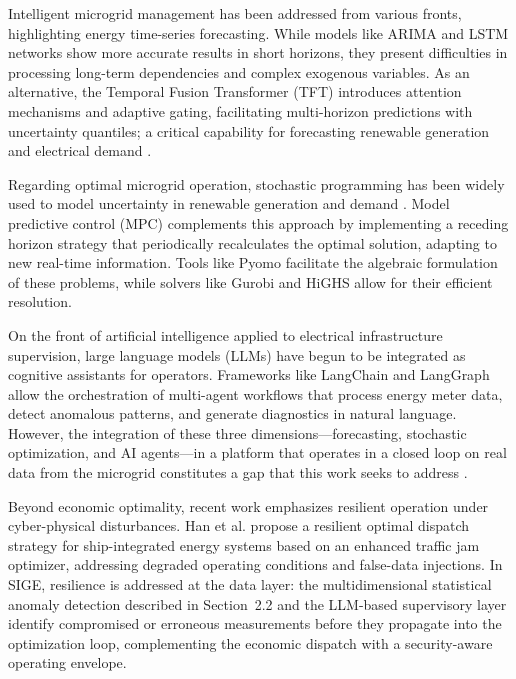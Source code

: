 \documentclass[journal,article,submit,pdftex,moreauthors]{Definitions/mdpi}
\begin{document}
Intelligent microgrid management has been addressed from various fronts, highlighting energy time-series forecasting. While models like ARIMA and LSTM networks show more accurate results in short horizons, they present difficulties in processing long-term dependencies and complex exogenous variables. As an alternative, the Temporal Fusion Transformer (TFT) \cite{ref-lim} introduces attention mechanisms and adaptive gating, facilitating multi-horizon predictions with uncertainty quantiles; a critical capability for forecasting renewable generation and electrical demand \cite{ref-rao,ref-tasmant}.

Regarding optimal microgrid operation, stochastic programming has been widely used to model uncertainty in renewable generation and demand \cite{ref-birge,Parisio2014,Su2014,Zia2018,Hua2019}. Model predictive control (MPC) \cite{ref-rawlings} complements this approach by implementing a receding horizon strategy that periodically recalculates the optimal solution, adapting to new real-time information. Tools like Pyomo \cite{ref-bynum} facilitate the algebraic formulation of these problems, while solvers like Gurobi \cite{ref-gurobi} and HiGHS \cite{ref-huangfu} allow for their efficient resolution.

On the front of artificial intelligence applied to electrical infrastructure supervision, large language models (LLMs) have begun to be integrated as cognitive assistants for operators. Frameworks like LangChain \cite{ref-chase} and LangGraph allow the orchestration of multi-agent workflows that process energy meter data, detect anomalous patterns, and generate diagnostics in natural language. However, the integration of these three dimensions—forecasting, stochastic optimization, and AI agents—in a platform that operates in a closed loop on real data from the microgrid constitutes a gap that this work seeks to address \cite{ref-lami}.

Beyond economic optimality, recent work emphasizes resilient operation under cyber-physical disturbances. Han et al. \cite{Han2026} propose a resilient optimal dispatch strategy for ship-integrated energy systems based on an enhanced traffic jam optimizer, addressing degraded operating conditions and false-data injections. In SIGE, resilience is addressed at the data layer: the multidimensional statistical anomaly detection described in Section~2.2 and the LLM-based supervisory layer identify compromised or erroneous measurements before they propagate into the optimization loop, complementing the economic dispatch with a security-aware operating envelope.
\end{document}
